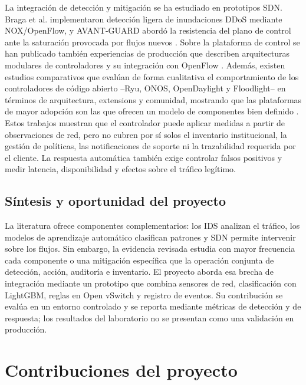La integraci\'on de detecci\'on y mitigaci\'on se ha estudiado en prototipos SDN. Braga et al. implementaron detecci\'on ligera de inundaciones DDoS mediante NOX/OpenFlow, y AVANT-GUARD abord\'o la resistencia del plano de control ante la saturaci\'on provocada por flujos nuevos \parencite{braga2010,shin2013}. Sobre la plataforma de control se han publicado tambi\'en experiencias de producci\'on que describen arquitecturas modulares de controladores y su integraci\'on con OpenFlow \parencite{berde2014onos,kubo2014ryu,ryudocs}. Adem\'as, existen estudios comparativos que eval\'uan de forma cualitativa el comportamiento de los controladores de c\'odigo abierto --Ryu, ONOS, OpenDaylight y Floodlight-- en t\'erminos de arquitectura, extensions y comunidad, mostrando que las plataformas de mayor adopci\'on son las que ofrecen un modelo de componentes bien definido \parencite{bondkovskii2016,khattak2014odl}. Estos trabajos muestran que el controlador puede aplicar medidas a partir de observaciones de red, pero no cubren por s\'i solos el inventario institucional, la gesti\'on de pol\'iticas, las notificaciones de soporte ni la trazabilidad requerida por el cliente. La respuesta autom\'atica tambi\'en exige controlar falsos positivos y medir latencia, disponibilidad y efectos sobre el tr\'afico leg\'itimo.

\subsection{S\'intesis y oportunidad del proyecto}

La literatura ofrece componentes complementarios: los IDS analizan el tr\'afico, los modelos de aprendizaje autom\'atico clasifican patrones y SDN permite intervenir sobre los flujos. Sin embargo, la evidencia revisada estudia con mayor frecuencia cada componente o una mitigaci\'on espec\'ifica que la operaci\'on conjunta de detecci\'on, acci\'on, auditor\'ia e inventario. El proyecto aborda esa brecha de integraci\'on mediante un prototipo que combina sensores de red, clasificaci\'on con LightGBM, reglas en Open vSwitch y registro de eventos. Su contribuci\'on se eval\'ua en un entorno controlado y se reporta mediante m\'etricas de detecci\'on y de respuesta; los resultados del laboratorio no se presentan como una validaci\'on en producci\'on.

\section{Contribuciones del proyecto}
\label{sec:contribuciones}

